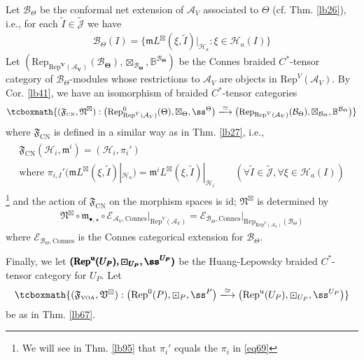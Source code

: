 \documentclass[11pt,b5paper,notitlepage]{article}
\theoremstyle{definition}
\theoremstyle{plain}
\newcommand{\fk}{\mathfrak}
\newcommand{\mc}{\mathcal}
\newcommand{\wtd}{\widetilde}
\newcommand{\id}{\mathrm{id}}
\newcommand{\Rep}{\mathrm{Rep}}
\newcommand{\scr}{\mathscr}
\newcommand{\Jtd}{\widetilde{\mathcal J}}
\newcommand{\mbb}{\mathbb}
\newcommand{\blt}{\bullet}
\newcommand{\mk}{\mathfrak m}
\newcommand{\VOA}{{\scriptscriptstyle \mathrm{VOA}}}
\newcommand{\CN}{{\scriptscriptstyle \mathrm{CN}}}
\newcommand{\RepUP}{\mathrm{Rep}^{\mathrm u}(U_P)}
\newcommand{\Connes}{\mathrm{Connes}}
\numberwithin{equation}{section}
\begin{document}
Let $\mc B_\Theta$ be the conformal net extension of $\mc A_V$ associated to $\Theta$ (cf. Thm. \ref{lb26}), i.e., for each $\wtd I\in\Jtd$ we have
\begin{align}\label{eq75}
\mc B_\Theta(I)=\big\{\mk L^\boxtimes(\xi,\wtd I)|_{\mc H_a}:\xi\in\mc H_a(I) \big\}
\end{align}
Let $\pmb{(\Rep_{\Rep^V(\mc A_V)}(\mc B_\Theta),\boxtimes_{\mc B_\Theta},\mbb B^{\mc B_\Theta})}$ be the Connes braided $C^*$-tensor category of $\mc B_\Theta$-modules whose restrictions to $\mc A_V$ are objects in $\Rep^V(\mc A_V)$. By Cor. \ref{lb41}, we have an isomorphism of braided $C^*$-tensor categories
\begin{align}\label{eq87}
\tcboxmath{(\fk F_\CN,\fk N^\boxtimes):\big(\Rep_{\Rep^V(\mc A_V)}^0(\Theta),\boxtimes_\Theta,\ss^\Theta\big)\xlongrightarrow{\simeq} \big(\Rep_{\Rep^V(\mc A_V)}(\mc B_\Theta),\boxtimes_{\mc B_\Theta},\mbb B^{\mc B_\Theta}\big)}
\end{align}
where $\fk F_\CN$ is defined in a similar way as in Thm. \ref{lb27}, i.e.,
\begin{gather}\label{eq84}
\begin{gathered}
\fk F_\CN(\mc H_i,\mk^i)=(\mc H_i,\pi_i')\\
\text{where }\pi_{i,I}'(\mk L^\boxtimes(\xi,\wtd I)|_{\mc H_a})=\mk^i L^\boxtimes(\xi,\wtd I)|_{\mc H_i}\qquad(\forall\wtd I\in\Jtd,\forall\xi\in\mc H_a(I))
\end{gathered}
\end{gather}
\footnote{We will see in Thm. \ref{lb95} that $\pi_i'$ equals the $\pi_i$ in \eqref{eq69}} and the action of $\fk F_\CN$ on the morphism spaces is $\id$;   $\fk N^\boxtimes$ is determined by
\begin{align}\label{eq82}
\fk N^\boxtimes\circ \mk_{\blt,\star}\circ\scr E_{\mc A_V,\Connes}\big|_{\Rep^V(\mc A_V)}=\scr E_{\mc B_{\Theta},\Connes}\big|_{\Rep_{\Rep^V(\mc A_V)}(\mc B_\Theta)}
\end{align}
where $\scr E_{\mc B_\Theta,\Connes}$ is the Connes categorical extension for $\mc B_\Theta$.

Finally, we let $\pmb{(\RepUP,\boxdot_{U_P},\ss^{U_P})}$ be the Huang-Lepowsky braided $C^*$-tensor category for $U_P$. Let
\begin{align}
\tcboxmath{(\fk F_\VOA,\fk V^\boxdot):\big(\Rep^0(P),\boxdot_P,\ss^P \big)\xlongrightarrow{\simeq}\big(\RepUP,\boxdot_{U_P},\ss^{U_P}\big)}
\end{align}
be as in Thm. \ref{lb67}.
\end{document}

